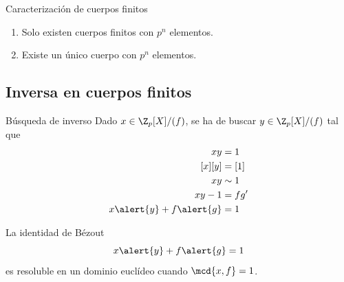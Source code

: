 \documentclass[10pt,t]{beamer}
\begin{document}
\begin{frame}
    \vspace{8em}
    \begin{teo}{Caracterización de cuerpos finitos}
        \vspace{0.5em}
        \begin{enumerate}[label=--]
            \item Solo existen cuerpos finitos con $p^n$ elementos.
            \item Existe un único cuerpo con $p^n$ elementos.
        \end{enumerate}
    \end{teo}
\end{frame}

\subsection{Inversa en cuerpos finitos}

\begin{frame}
    \begin{block}{\centering \large Búsqueda de inverso}
        Dado $x\in \Z_p[X]/(f)$, se ha de buscar $y\in \Z_p[X]/(f)$ tal que
        \setlength{\belowdisplayskip}{-1pt}   %
        \vspace{-0.5em}
        \begin{align*}
            \setlength{\itemsep}{-0.3em}
            xy      &= 1    \\
            [x][y]  &= [1]  \\
            xy      &\sim 1       \\
            xy - 1  &= fg'    \\
            x\alert{y} + f\alert{g}  &= 1    
        \end{align*}

    \end{block}

    \begin{prop}
        La identidad de Bézout \[x\alert{y} + f\alert{g}  = 1\] es resoluble en un dominio euclídeo cuando  $\mcd{x,f} = 1$.
    \end{prop}

\end{frame}
\end{document}
